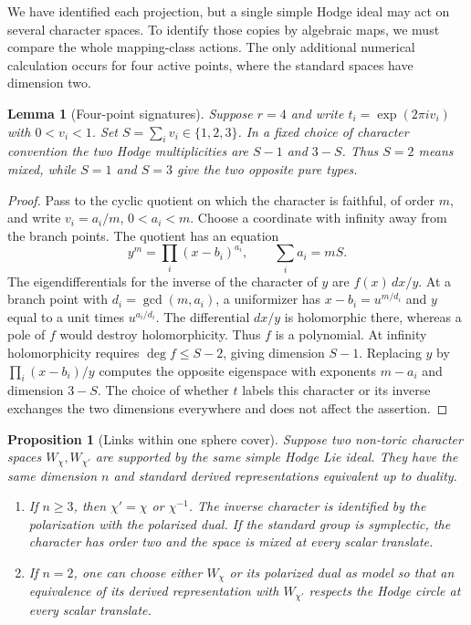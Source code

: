 \documentclass[11pt]{article}
\theoremstyle{plain}
\newtheorem{proposition}[theorem]{Proposition}
\newtheorem{lemma}[theorem]{Lemma}
\theoremstyle{definition}
\theoremstyle{remark}
\numberwithin{equation}{section}
\begin{document}
We have identified each projection, but a single simple Hodge ideal
may act on several character spaces.  To identify those copies by
algebraic maps, we must compare the whole mapping-class actions.
The only additional numerical calculation occurs for four active
points, where the standard spaces have dimension two.

\begin{lemma}[Four-point signatures]\label{p4:sphere-four-signatures}
Suppose $r=4$ and write $t_i=\exp(2\pi i v_i)$ with
$0<v_i<1$.  Set $S=\sum_i v_i\in\{1,2,3\}$.  In a fixed
choice of character convention the two Hodge multiplicities are
$S-1$ and $3-S$.  Thus $S=2$ means mixed, while $S=1$ and
$S=3$ give the two opposite pure types.
\end{lemma}

\begin{proof}
Pass to the cyclic quotient on which the character is faithful,
of order $m$, and write $v_i=a_i/m$, $0<a_i<m$.
Choose a coordinate with infinity away from the branch points.
The quotient has an equation
\[
 y^m=\prod_i(x-b_i)^{a_i},\qquad \sum_i a_i=mS.
\]
The eigendifferentials for the inverse of the character of $y$
are $f(x)\,dx/y$.  At a branch point with
$d_i=\gcd(m,a_i)$, a uniformizer has
$x-b_i=u^{m/d_i}$ and $y$ equal to a unit times
$u^{a_i/d_i}$.  The differential $dx/y$ is holomorphic there,
whereas a pole of $f$ would destroy holomorphicity.  Thus $f$ is
a polynomial.  At infinity holomorphicity requires
$\deg f\le S-2$, giving dimension $S-1$.  Replacing $y$ by
$\prod_i(x-b_i)/y$ computes the opposite eigenspace with
exponents $m-a_i$ and dimension $3-S$.  The choice of whether
$t$ labels this character or its inverse exchanges the two
dimensions everywhere and does not affect the assertion.
\end{proof}

\begin{proposition}[Links within one sphere cover]\label{p4:sphere-links}
Suppose two non-toric character spaces $W_\chi,W_{\chi'}$
are supported by the same simple Hodge Lie ideal.
They have the same dimension $n$ and standard derived
representations equivalent up to duality.
\begin{enumerate}[label=\textup{(\roman*)}]
\item If $n\ge3$, then $\chi'=\chi$ or $\chi^{-1}$.
The inverse character is identified by the polarization with the
polarized dual.  If the standard group is symplectic, the
character has order two and the space is mixed at every
scalar translate.
\item If $n=2$, one can choose either $W_\chi$ or its polarized
dual as model so that an equivalence of its derived
representation with $W_{\chi'}$ respects the Hodge circle at
every scalar translate.
\end{enumerate}
\end{proposition}
\end{document}
